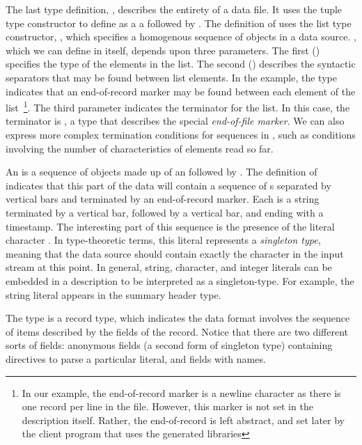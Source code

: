 The last type definition, , describes the entirety
of a \dibbler{} data file.  It uses the tuple type
constructor \cd{*} to define  as a a 
followed by . 
The definition of  uses the list type
constructor, , which specifies a homogenous sequence of
objects in a data source.  , which we can define in \padsml{} itself,
depends upon three parameters.  The first () specifies the
type of the elements in the list.  The second () describes
the syntactic separators that may be found between list elements.
In the example, the type  indicates that an end-of-record marker
may be found between each element of the list~\footnote{%
  In our example, the end-of-record marker is a newline 
  character as there is one record per line in the file.  However,
  this marker is not set in the description itself.  Rather, the
  end-of-record is left abstract, and set later by the client program
  that uses the generated libraries}. 
The third parameter indicates the terminator for the list.  In this
case, the terminator is , a 
type that describes the special \emph{end-of-file marker}.  
We can also express more complex termination
conditions for sequences in \padsml{}, such as conditions involving
the number of characteristics of elements read so far.

An  is a sequence of objects made up of an
 followed by .  The definition of
 indicates that this part of the \dibbler{} data will
contain a sequence of s separated by vertical bars and
terminated by an end-of-record marker.  Each  is a string
terminated by a vertical bar, followed by a vertical bar, and ending
with a timestamp.  The interesting part of this
sequence is the presence of the literal character .  In
type-theoretic terms, this literal represents a {\em singleton type},
meaning that the data source should contain exactly the character
 in the input stream at this point.  In general, string,
character, and 
integer literals can be embedded in a description to be interpreted as
a singleton-type. For example, the string literal  appears in
the summary header type.

The type  is a record type, which indicates the data
format involves the sequence of items described by the fields of the
record.  Notice that there are two different sorts of fields:
anonymous fields (a second form of singleton type) containing
directives to parse a particular literal, and fields with names.

